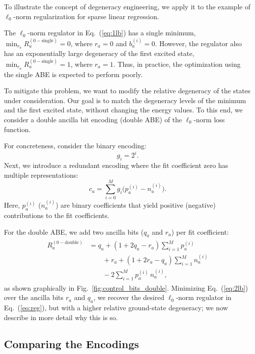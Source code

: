 \documentclass[aps,prd,twocolumn, superscriptaddress,preprintnumbers, nofootinbib,longbibliography,floatfix]{revtex4-2}
\DeclareRobustCommand{\Fig}[1]{Fig.~\ref{#1}}
\DeclareRobustCommand{\Eq}[1]{Eq.~(\ref{#1})}
\begin{document}
To illustrate the concept of degeneracy engineering, we apply it to the example of $\ell_0$-norm regularization for sparse linear regression. 


The $\ell_0$-norm regulator in \Eq{eq:1lb} has a single minimum, $\min_{r_a} R_a^{(0-\text{single})}=0$, where $r_a=0$ and $b_a^{\left(i\right)}=0$.
%
However, the regulator also has an exponentially large degeneracy of the first excited state, $\min_{r_a} R_a^{(0-\text{single})}=1$, where $r_a=1$.
%
Thus, in practice, the optimization using the single ABE is expected to perform poorly.


To mitigate this problem, we want to modify the relative degeneracy of the states under consideration.
%
Our goal is to match the degeneracy levels of the minimum and the first excited state, without changing the energy values.
%
To this end, we consider a double ancilla bit encoding (double ABE) of the $\ell_0$-norm loss function.


For concreteness, consider the binary encoding:
%
\begin{equation}
    g_i = 2^i.
\end{equation}
%
Next, we introduce a redundant encoding where the fit coefficient zero has multiple representations:
%
\begin{equation}
\label{eq:positive_negative}
c_a = \sum_{i=0}^M  g_i \big( p_a^{(i)} - n_a^{(i)} \big).
\end{equation}
%
Here, $p_a^{(i)}$ ($n_a^{(i)}$) are binary coefficients that yield positive (negative) contributions to the fit coefficients.


For the double ABE, we add two ancilla bits ($q_a$ and $r_a$) per fit coefficient:
%
\begin{align}
\begin{split}
\label{eq:2lb}
R_a^{(0-\text{double})} &= q_a + (1 + 2q_a - r_a) \sum_{i = 1}^M  p^{(i)}_a\\
&\qquad + r_a + (1 + 2r_a - q_a) \sum_{i = 1}^M  n^{(i)}_a \\
&\qquad - 2 \sum_{i = 1}^M p^{(i)}_a \, n^{(i)}_a,
\end{split}
\end{align}
%
as shown graphically in \Fig{fig:control_bits_double}.
%
Minimizing \Eq{eq:2lb} over the ancilla bits $r_a$ and $q_a$, we recover the desired $\ell_0$-norm regulator in \Eq{eq:reg}, but with a higher relative ground-state degeneracy; we now describe in more detail why this is so.

\subsection{Comparing the Encodings}
\end{document}
